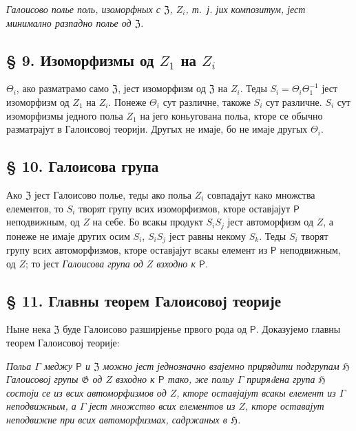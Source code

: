\documentclass[11pt]{article}
\begin{document}
\emph{Галоисово полье поль, изоморфных с \(\mathfrak Z\), \(Z_i\), т.~ј. јих композитум, јест минимално разпадно полье од \(\mathfrak Z\).}

\subsection*{§ 9. Изоморфизмы од \(Z_1\) на \(Z_i\)}\label{die-isomorphismen-von-z1-auf-die-zi}

\(\Theta_i\), ако разматрамо само \(\mathfrak Z\), јест изоморфизм од \(\mathfrak Z\) на \(Z_i\). Теды \(S_i=\Theta_i\Theta_1^{-1}\) јест изоморфизм од \(Z_1\) на \(Z_i\). Понеже \(\Theta_i\) сут различне, такоже \(S_i\) сут различне. \(S_i\) сут изоморфизмы једного польа \(Z_1\) на јего коньугована польа, кторе се обычно разматрајут в Галоисовој теорији. Другых не имаје, бо не имаје другых \(\Theta_i\).

\subsection*{§ 10. Галоисова група}\label{die-galoissche-gruppe}

Ако \(\mathfrak Z\) јест Галоисово полье, теды ако польа \(Z_i\) совпадајут како множства елементов, то \(S_i\) творят групу всих изоморфизмов, кторе оставјајут \(\mathsf P\) неподвижным, од \(Z\) на себе. Бо всакы продукт \(S_iS_j\) јест автоморфизм од \(Z\), а понеже не имаје других осим \(S_i\), \(S_iS_j\) јест равны некому \(S_k\). Теды \(S_i\) творят групу всих автоморфизмов, кторе оставјајут всакы елемент из \(\mathsf P\) неподвижным, од \(Z\); то јест \emph{Галоисова група од \(Z\) взходно к \(\mathsf P\)}.

\subsection*{§ 11. Главны теорем Галоисовој теорије}\label{der-hauptsatz-der-galoisschen-theorie}

Ныне нека \(\mathfrak Z\) буде Галоисово разширјенье првого рода од \(\mathsf P\). Доказујемо главны теорем Галоисовој теорије:

\emph{Польа \(\Gamma\) меджу \(\mathsf P\) и \(\mathfrak Z\) можно јест једнозначно взајемно прирядити подгрупам \(\mathfrak H\) Галоисовој групы \(\mathfrak G\) од \(Z\) взходно к \(\mathsf P\) тако, же польу \(\Gamma\) приряđена група \(\mathfrak H\) состоји се из всих автоморфизмов од \(Z\), кторе оставјајут всакы елемент из \(\Gamma\) неподвижным, а \(\Gamma\) јест множство всих елементов из \(Z\), кторе оставајут неподвижне при всих автоморфизмах, садржаных в \(\mathfrak H\).}
\end{document}
